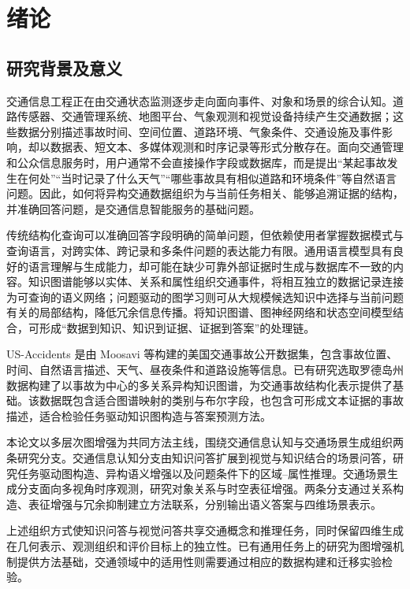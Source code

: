 
\chapter{绪论}

\section{研究背景及意义}

交通信息工程正在由交通状态监测逐步走向面向事件、对象和场景的综合认知。道路传感器、交通管理系统、地图平台、气象观测和视觉设备持续产生交通数据；这些数据分别描述事故时间、空间位置、道路环境、气象条件、交通设施及事件影响，却以数据表、短文本、多媒体观测和时序记录等形式分散存在。面向交通管理和公众信息服务时，用户通常不会直接操作字段或数据库，而是提出“某起事故发生在何处”“当时记录了什么天气”“哪些事故具有相似道路和环境条件”等自然语言问题。因此，如何将异构交通数据组织为与当前任务相关、能够追溯证据的结构，并准确回答问题，是交通信息智能服务的基础问题。

传统结构化查询可以准确回答字段明确的简单问题，但依赖使用者掌握数据模式与查询语言，对跨实体、跨记录和多条件问题的表达能力有限。通用语言模型具有良好的语言理解与生成能力，却可能在缺少可靠外部证据时生成与数据库不一致的内容。知识图谱能够以实体、关系和属性组织交通事件，将相互独立的数据记录连接为可查询的语义网络；问题驱动的图学习则可从大规模候选知识中选择与当前问题有关的局部结构，降低冗余信息传播。将知识图谱、图神经网络和状态空间模型结合，可形成“数据到知识、知识到证据、证据到答案”的处理链。

US-Accidents 是由 Moosavi 等构建的美国交通事故公开数据集，包含事故位置、时间、自然语言描述、天气、昼夜条件和道路设施等信息。已有研究选取罗德岛州数据构建了以事故为中心的多关系异构知识图谱，为交通事故结构化表示提供了基础。该数据既包含适合图谱映射的类别与布尔字段，也包含可形成文本证据的事故描述，适合检验任务驱动知识图构造与答案预测方法。

本论文以多层次图增强为共同方法主线，围绕交通信息认知与交通场景生成组织两条研究分支。交通信息认知分支由知识问答扩展到视觉与知识结合的场景问答，研究任务驱动图构造、异构语义增强以及问题条件下的区域--属性推理。交通场景生成分支面向多视角时序观测，研究对象关系与时空表征增强。两条分支通过关系构造、表征增强与冗余抑制建立方法联系，分别输出语义答案与四维场景表示。

上述组织方式使知识问答与视觉问答共享交通概念和推理任务，同时保留四维生成在几何表示、观测组织和评价目标上的独立性。已有通用任务上的研究为图增强机制提供方法基础，交通领域中的适用性则需要通过相应的数据构建和迁移实验检验。

